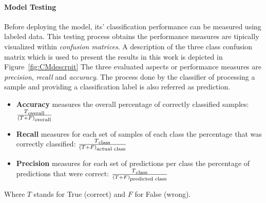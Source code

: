 \documentclass{article}
\begin{document}
\paragraph*{Model Testing}
Before deploying the model, its' classification performance can be measured using labeled data.
This testing process obtains the performance measures are tipically visualized within \emph{confusion matrices}. 
A description of the three class confusion matrix which is used to present the results in this work is depicted in Figure~\ref{fig:CMdescrpit}
The three evaluated aspects or performance measures are \emph{precision}, \emph{recall} and \emph{accuracy}.
The process done by the classifier of processing a sample and providing a classification label is also referred as prediction.
\begin{itemize}
\item \textbf{Accuracy} measures the overall percentage of correctly classified samples: $\frac{T\textsubscript{overall}}{(T+F)\textsubscript{overall}}$ 
\item \textbf{Recall} measures for each set of samples of each class the percentage that was correctly classified: $\frac{T\textsubscript{class}}{(T+F)\textsubscript{actual class}}$%
\item \textbf{Precision} measures for each set of predictions per class the percentage of predictions that were correct: $\frac{T\textsubscript{class}}{(T+F)\textsubscript{predicted class}}$%
\end{itemize}
Where $T$ stands for True (correct) and $F$ for False (wrong).



\end{document}
